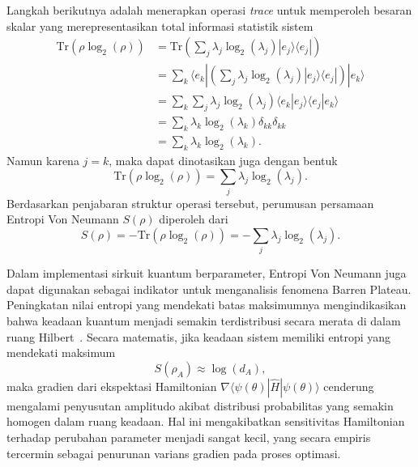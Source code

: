 Langkah berikutnya adalah menerapkan operasi \textit{trace} untuk memperoleh besaran skalar yang merepresentasikan total informasi statistik sistem
\begin{equation}
\begin{split}
    \text{Tr}(\rho \log_2(\rho)) &= \text{Tr} \left( \sum_j \lambda_j \log_2(\lambda_j) |e_j\rangle \langle e_j| \right) \\
    &= \sum_k \langle e_k | \left( \sum_j \lambda_j \log_2(\lambda_j) |e_j\rangle \langle e_j| \right) |e_k\rangle \\
    &= \sum_k \sum_j \lambda_j \log_2(\lambda_j) \langle e_k | e_j \rangle \langle e_j | e_k \rangle \\
    &= \sum_k \lambda_k \log_2(\lambda_k) \delta_{kk} \delta_{kk} \\
    &= \sum_k \lambda_k \log_2(\lambda_k).
\end{split}
\end{equation}
Namun karena $j=k$, maka dapat dinotasikan juga dengan bentuk
\begin{equation}
    \text{Tr}(\rho \log_2(\rho)) = \sum_j \lambda_j \log_2(\lambda_j).
\end{equation}
Berdasarkan penjabaran struktur operasi tersebut, perumusan persamaan Entropi Von Neumann $S(\rho)$ diperoleh dari
\begin{equation}
\label{eq:entropi_von_neumann}
    S(\rho) = -\text{Tr}(\rho \log_2(\rho)) = -\sum_j \lambda_j \log_2 (\lambda_j).
\end{equation}

Dalam implementasi sirkuit kuantum berparameter, Entropi Von Neumann juga dapat digunakan sebagai indikator untuk menganalisis fenomena Barren Plateau. Peningkatan nilai entropi yang mendekati batas maksimumnya mengindikasikan bahwa keadaan kuantum menjadi semakin terdistribusi secara merata di dalam ruang Hilbert~\cite{crosato_shannon_2023}. Secara matematis, jika keadaan sistem memiliki entropi yang mendekati maksimum
\begin{equation}
    S(\rho_A) \approx \log(d_A),
\end{equation}
maka gradien dari ekspektasi Hamiltonian $\nabla\langle\psi(\theta)| \hat{H}|\psi(\theta)\rangle$ cenderung mengalami penyusutan amplitudo akibat distribusi probabilitas yang semakin homogen dalam ruang keadaan. Hal ini mengakibatkan sensitivitas Hamiltonian terhadap perubahan parameter menjadi sangat kecil, yang secara empiris tercermin sebagai penurunan varians gradien pada proses optimasi.